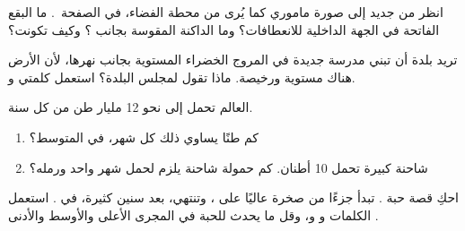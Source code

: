 \begin{exercise}[$\star\star$]\label{exo:g5:water-shapes-the-land:8}
انظر من جديد إلى صورة  ماموري كما يُرى من محطة
الفضاء، في الصفحة~\pageref{fig:g5:water-shapes-the-land:mamore}. ما البقع الفاتحة في الجهة الداخلية
للانعطافات؟ وما  الداكنة المقوسة بجانب ؟ وكيف تكونت؟
\end{exercise}

\begin{exercise}[$\star\star$]\label{exo:g5:water-shapes-the-land:9}
تريد بلدة أن تبني مدرسة جديدة في المروج الخضراء المستوية بجانب
نهرها، لأن الأرض هناك مستوية ورخيصة. ماذا تقول
لمجلس البلدة؟ استعمل كلمتي \emph{} و\emph{}.
\end{exercise}

\begin{exercise}[$\star\star$]\label{exo:g5:water-shapes-the-land:10}
 العالم تحمل إلى  نحو 12 مليار طن من  
كل سنة.
\begin{enumerate}
  \item[(أ)] كم طنًا يساوي ذلك كل شهر، في المتوسط؟
  \item[(ب)] شاحنة كبيرة تحمل 10 أطنان. كم حمولة شاحنة يلزم
        لحمل  شهر واحد ورمله؟
\end{enumerate}
\end{exercise}

\begin{exercise}[$\star\star\star$]\label{exo:g5:water-shapes-the-land:11}
احكِ قصة حبة . تبدأ جزءًا من صخرة عاليًا على
، وتنتهي، بعد سنين كثيرة، في . استعمل الكلمات
\emph{} و\emph{} و\emph{}، وقل ما يحدث
للحبة في المجرى الأعلى والأوسط والأدنى .
\end{exercise}
